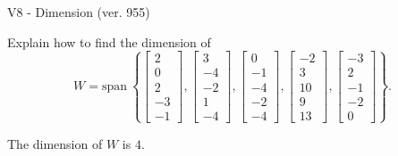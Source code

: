 \begin{exercise}
  \begin{exerciseTitle}V8 - Dimension (ver. 955)\end{exerciseTitle}
  \begin{exerciseStatement}
    Explain how to find the dimension of 
\[W=\mathrm{span}\ \left\{\left[\begin{array}{r}
2 \\
0 \\
2 \\
-3 \\
-1
\end{array}\right] , \left[\begin{array}{r}
3 \\
-4 \\
-2 \\
1 \\
-4
\end{array}\right] , \left[\begin{array}{r}
0 \\
-1 \\
-4 \\
-2 \\
-4
\end{array}\right] , \left[\begin{array}{r}
-2 \\
3 \\
10 \\
9 \\
13
\end{array}\right] , \left[\begin{array}{r}
-3 \\
2 \\
-1 \\
-2 \\
0
\end{array}\right]\right\}.\]



  \end{exerciseStatement}
  \begin{exerciseAnswer}
   The dimension of \(W\) is  \(4\).
  


  \end{exerciseAnswer}
\end{exercise}